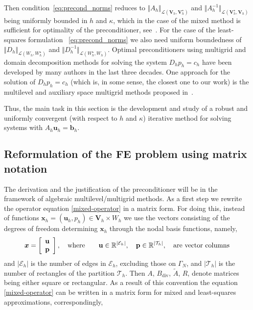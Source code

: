 \documentclass[11pt]{amsart}
\numberwithin{equation}{section}
\theoremstyle{definition}\newtheorem{example}{Example}[section]
\begin{document}
Then condition~\eqref{eq:precond_norms} reduces to $\Vert A_h
\Vert_{\mathcal{L}({{\boldsymbol V}}_h,{{\boldsymbol V}}_h^{\star})}$ and $\Vert
A_h^{-1}\Vert_{\mathcal{L}({{\boldsymbol V}}_h^{\star},{{\boldsymbol V}}_h)}$ being uniformly
bounded in $h$ and $\kappa$, which in the case of the mixed method is
sufficient for optimality of the preconditioner,
see~\cite{Arnold1997preconditioning}.  For the case of the least-squares
formulation ~\eqref{eq:precond_norms} we also need uniform boundedness
of $\Vert D_h \Vert_{\mathcal{L}(W_h, W_h^{\star})}$ and
$\Vert D_h^{-1}\Vert_{\mathcal{L}(W_h^{\star},W_h)}$.
Optimal
  preconditioners using multigrid and domain decomposition methods for
  solving the system
$D_h p_h=c_h$
have been developed by many authors
  in the last three decades. One approach for the solution of
$D_h p_h=c_h$
(which is, in some sense, the closest one to our work)
is the multilevel and auxiliary space multigrid methods proposed
in~\cite{Kraus_12,Kraus_Lymb_Mar_2014}. 

Thus, the main task  in this section is the development and study of
a robust and uniformly convergent (with respect to $h$ and $\kappa$)
iterative method for solving systems with
$A_h {{\mathbf u}}_h={{\mathbf b}}_h$. 

\subsection{Reformulation of the FE problem using matrix notation}\label{sec:matrix-notation}
The derivation and the justification of the
preconditioner
will be in the
framework of algebraic multilevel/multigrid methods. As a first step
we rewrite the operator equation \eqref{mixed-operator} in a matrix
form. For doing this, instead of functions ${\bm x}_h =({{\mathbf u}}_h, p_h)
\in {{\boldsymbol V}}_h \times W_h$ we use the vectors consisting of the
degrees of freedom determining ${\bm x}_h$ 
through the nodal basis functions, namely,
$$
{\bm x}=\left[
\begin{array}{c}
 {\bf u} \\
 {\bf p}
\end{array} \right ],
\quad \mbox{where} \quad
\quad {\bf u} \in \mathbb{R}^{|\mathcal{E}_h|},
\quad {\bf p} \in \mathbb{R}^{|\mathcal{T}_h|},
\quad \mbox{are vector columns} 
$$
and $ {|\mathcal{E}_h|}$ is the number of edges in $ \mathcal{E}_h$, excluding those 
on $\Gamma_N$, and $ {|\mathcal{T}_h|}$  is the number of
rectangles of the partition $ \mathcal{T}_h$.  Then $A$, ${B_{\operatorname{div}}}$,
$\widetilde A$, $R$, denote matrices being either square or
rectangular.  As a result of this convention
the equation \eqref{mixed-operator} can be written in a matrix form  
for mixed and least-squares approximations, correspondingly,
\end{document}
